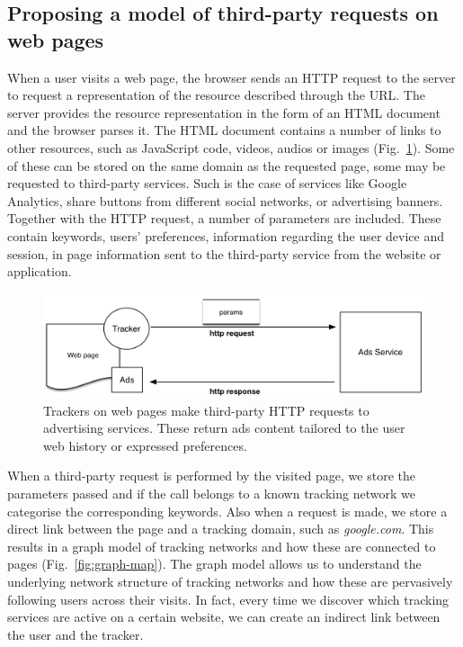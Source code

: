 \subsection{Proposing a model of third-party requests on web pages}
\noindent
When a user visits a web page, the browser sends an HTTP request to the server to request a representation of the resource described through the URL. The server provides the resource representation in the form of an HTML document and the browser parses it. The HTML document contains a number of links to other resources, such as JavaScript code, videos, audios or images (Fig.~\ref{fig:third-party}). Some of these can be stored on the same domain as the requested page, some may be requested to third-party services. Such is the case of services like Google Analytics, share buttons from different social networks, or advertising banners. Together with the HTTP request, a number of parameters are included. These contain keywords, users' preferences, information regarding the user device and session, in page information sent to the third-party service from the website or application.

\begin{figure}
\includegraphics[width=\textwidth]{figures/tracker-request.png}
\caption[Structure of a tracker request]{Trackers on web pages make third-party HTTP requests to advertising services. These return ads content tailored to the user web history or expressed preferences.}
\label{fig:third-party}
\end{figure}


When a third-party request is performed by the visited page, we store the parameters passed and if the call belongs to a known tracking network we categorise the corresponding keywords. Also when a request is made, we store a direct link between the page and a tracking domain, such as \emph{google.com}. This results in a graph model of tracking networks and how these are connected to pages (Fig.~\ref{fig:graph-map}). The graph model allows us to understand the underlying network structure of tracking networks and how these are pervasively following users across their visits. In fact, every time we discover which tracking services are active on a certain website, we can create an indirect link between the user and the tracker.


